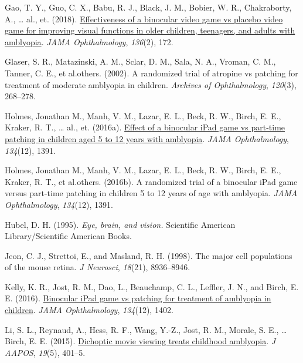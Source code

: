 \documentclass[
  onecolumn]{article}
\newlength{\cslhangindent}
\newenvironment{CSLReferences}[2] %
 {%
  \setlength{\parindent}{0pt}
  \ifodd #1 \everypar{\setlength{\hangindent}{\cslhangindent}}\ignorespaces\fi
  \ifnum #2 > 0
  \setlength{\parskip}{#2\baselineskip}
  \fi
 }%
 {}
\begin{document}
\begin{CSLReferences}{1}{0}
\leavevmode{}%
Gao, T. Y., Guo, C. X., Babu, R. J., Black, J. M., Bobier, W. R.,
Chakraborty, A., \ldots{} al., et. (2018).
\href{https://doi.org/10.1001/jamaophthalmol.2017.6090}{Effectiveness of
a binocular video game vs placebo video game for improving visual
functions in older children, teenagers, and adults with amblyopia}.
\emph{JAMA Ophthalmology}, \emph{136}(2), 172.

\leavevmode{}%
Glaser, S. R., Matazinski, A. M., Sclar, D. M., Sala, N. A., Vroman, C.
M., Tanner, C. E., et al.others. (2002). A randomized trial of atropine
vs patching for treatment of moderate amblyopia in children.
\emph{Archives of Ophthalmology}, \emph{120}(3), 268--278.

\leavevmode{}%
Holmes, Jonathan M., Manh, V. M., Lazar, E. L., Beck, R. W., Birch, E.
E., Kraker, R. T., \ldots{} al., et. (2016a).
\href{https://doi.org/10.1001/jamaophthalmol.2016.4262}{Effect of a
binocular iPad game vs part-time patching in children aged 5 to 12 years
with amblyopia}. \emph{JAMA Ophthalmology}, \emph{134}(12), 1391.

\leavevmode{}%
Holmes, Jonathan M., Manh, V. M., Lazar, E. L., Beck, R. W., Birch, E.
E., Kraker, R. T., et al.others. (2016b). A randomized trial of a
binocular iPad game versus part-time patching in children 5 to 12 years
of age with amblyopia. \emph{JAMA Ophthalmology}, \emph{134}(12), 1391.

\leavevmode{}%
Hubel, D. H. (1995). \emph{Eye, brain, and vision.} Scientific American
Library/Scientific American Books.

\leavevmode{}%
Jeon, C. J., Strettoi, E., and Masland, R. H. (1998). {The major cell
populations of the mouse retina}. \emph{J Neurosci}, \emph{18}(21),
8936--8946.

\leavevmode{}%
Kelly, K. R., Jost, R. M., Dao, L., Beauchamp, C. L., Leffler, J. N.,
and Birch, E. E. (2016).
\href{https://doi.org/10.1001/jamaophthalmol.2016.4224}{Binocular iPad
game vs patching for treatment of amblyopia in children}. \emph{JAMA
Ophthalmology}, \emph{134}(12), 1402.

\leavevmode{}%
Li, S. L., Reynaud, A., Hess, R. F., Wang, Y.-Z., Jost, R. M., Morale,
S. E., \ldots{} Birch, E. E. (2015).
\href{https://doi.org/10.1016/j.jaapos.2015.08.003}{Dichoptic movie
viewing treats childhood amblyopia}. \emph{J AAPOS}, \emph{19}(5),
401--5.


\end{CSLReferences}
\end{document}
